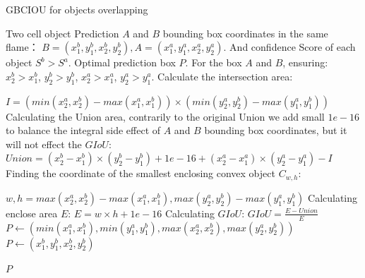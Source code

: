 \begin{algorithm}[htb]
  \caption{ GBCIOU for objects overlapping}
  \label{alg:Framwork}
  \begin{algorithmic}[1]
    \Require
     Two cell object Prediction $A$ and $B$ bounding box coordinates in the same flame：
     $ B=\left ( x_{1}^{b},y_{1}^{b},x_{2}^{b},y_{2}^{b} \right ),A=\left ( x_{1}^{a},y_{1}^{a},x_{2}^{a},y_{2}^{a} \right ).$ And confidence Score of each object $S^{b}>S^{a}$.
    \Ensure
     Optimal prediction box $P$. 
    \State For the box $A$ and $B$, ensuring: $x_{2}^{b} > x_{1}^{b}$, $y_{2}^{b} > y_{1}^{b}$, $x_{2}^{a} > x_{1}^{a}$, $y_{2}^{a} > y_{1}^{a}$.
    \State Calculate the intersection area:
    
    $I= (min(x_{2}^{a}, x_{2}^{b}) - max(x_{1}^{a}, x_{1}^{b})) \times (min(y_{2}^{a},y_{2}^{b})- max(y_{1}^{a},y_{1}^{b})) $
    \State Calculating the Union area, contrarily to the original Union we add small $1e-16 $
    to balance the integral side effect of $A$ and $B$ bounding box coordinates, but it will not effect the $GIoU$: 
    $Union= (x_{2}^{b}-x_{1}^{b}) \times (y_{2}^{b}-y_{1}^{b})+ 1e-16 + (x_{2}^{a}-x_{1}^{a}) \times (y_{2}^{a}-y_{1}^{a}) -I $
    \State Finding the coordinate of the smallest enclosing convex object $C_{w,h}$: 
    
    $ w, h= max(x_{2}^{a}, x_{2}^{b}) - max(x_{1}^{a}, x_{1}^{b}), max(y_{2}^{a},y_{2}^{b}) - max(y_{1}^{a}, y_{1}^{b})$
    \State Calculating  enclose area  $E$: $E = w \times h + 1e-16$
    \State Calculating  $GIoU$: $GIoU= \frac{E - Union}{E}$ 
      \State  $P \gets( min(x_{1}^{a}, x_{1}^{b}), min(y_{1}^{a},y_{1}^{b}),max(x_{2}^{a}, x_{2}^{b}),max(y_{2}^{a},y_{2}^{b})) $ 
    \Else
      \State $P \gets (x_{1}^{b},y_{1}^{b},x_{2}^{b},y_{2}^{b})$
    \EndIf
    
    \Return $P$
    
  \end{algorithmic}
\end{algorithm}




